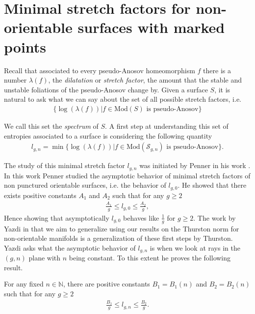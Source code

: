 \section{Minimal stretch factors for non-orientable surfaces with marked points}
\label{sec:application}

Recall that associated to every pseudo-Anosov homeomorphism $f$ there is a number $\lambda(f)$, the \textit{dilatation} or \textit{stretch factor}, the amount that the stable and unstable foliations of the pseudo-Anosov change by. Given a surface $S$, it is natural to ask what we can say about the set of all possible stretch factors, i.e.
\begin{align*}
    \{\log(\lambda(f)) | f \in \text{Mod}(S) \text{ is pseudo-Anosov}\}
\end{align*}

We call this set the \textit{spectrum} of $S$. A first step at understanding this set of entropies associated to a surface is considering the following quantity
\begin{align*}
    l_{g,n} =\min\{\log(\lambda(f)) | f \in \text{Mod}(\mathcal{S}_{g,n}) \text{ is pseudo-Anosov}\}.
\end{align*}

The study of this minimal stretch factor $l_{g,n}$ was initiated by Penner in his work \cite{penner1991bounds}. In this work Penner studied the asymptotic behavior of minimal stretch factors of non punctured orientable surfaces, i.e. the behavior of $l_{g,0}$. He showed that there exists positive constants $A_1$ and $A_2$ such that for any $g \geq 2$
\begin{align*}
    \frac{A_1}{g} \leq l_{g,0} \leq \frac{A_2}{g},
\end{align*}
Hence showing that asymptotically $l_{g,0}$ behaves like $\frac{1}{g}$ for $g \geq 2$. The work by Yazdi in \cite{yazdi2018pseudo} that we aim to generalize using our results on the Thurston norm for non-orientable manifolds is a generalization of these first steps by Thurston. Yazdi asks what the asymptotic behavior of $l_{g,n}$ is when we look at rays in the $(g,n)$ plane with $n$ being constant. To this extent he proves the following result.
\begin{thm}[Yazdi]
\label{thm:yazdi1}
For any fixed $n \in \mathbb{N}$, there are positive constants $B_1 = B_1(n)$ and $B_2 = B_2(n)$ such that for any $g \geq 2$
\begin{align*}
    \frac{B_1}{g} \leq l_{g,n} \leq \frac{B_2}{g}.
\end{align*}
\end{thm}


